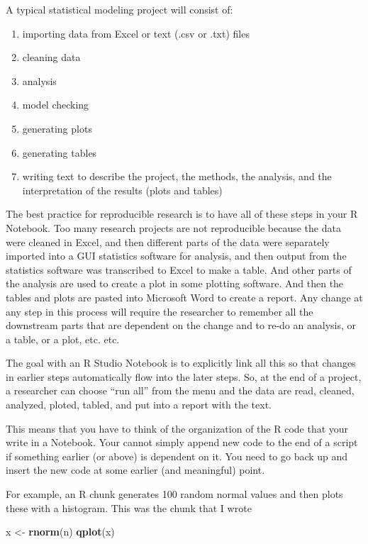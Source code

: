 \documentclass[]{book}
\newenvironment{Shaded}{\begin{snugshade}}{\end{snugshade}}
\newcommand{\KeywordTok}[1]{\textcolor[rgb]{0.13,0.29,0.53}{\textbf{#1}}}
\newcommand{\StringTok}[1]{\textcolor[rgb]{0.31,0.60,0.02}{#1}}
\newcommand{\NormalTok}[1]{#1}
\providecommand{\tightlist}{%
  \setlength{\itemsep}{0pt}\setlength{\parskip}{0pt}}
\begin{document}
A typical statistical modeling project will consist of:

\begin{enumerate}
\def\labelenumi{\arabic{enumi}.}
\tightlist
\item
  importing data from Excel or text (.csv or .txt) files
\item
  cleaning data
\item
  analysis
\item
  model checking
\item
  generating plots
\item
  generating tables
\item
  writing text to describe the project, the methods, the analysis, and
  the interpretation of the results (plots and tables)
\end{enumerate}

The best practice for reproducible research is to have all of these
steps in your R Notebook. Too many research projects are not
reproducible because the data were cleaned in Excel, and then different
parts of the data were separately imported into a GUI statistics
software for analysis, and then output from the statistics software was
transcribed to Excel to make a table. And other parts of the analysis
are used to create a plot in some plotting software. And then the tables
and plots are pasted into Microsoft Word to create a report. Any change
at any step in this process will require the researcher to remember all
the downstream parts that are dependent on the change and to re-do an
analysis, or a table, or a plot, etc. etc.

The goal with an R Studio Notebook is to explicitly link all this so
that changes in earlier steps automatically flow into the later steps.
So, at the end of a project, a researcher can choose ``run all'' from
the menu and the data are read, cleaned, analyzed, ploted, tabled, and
put into a report with the text.

This means that you have to think of the organization of the R code that
your write in a Notebook. Your cannot simply append new code to the end
of a script if something earlier (or above) is dependent on it. You need
to go back up and insert the new code at some earlier (and meaningful)
point.

For example, an R chunk generates 100 random normal values and then
plots these with a histogram. This was the chunk that I wrote

\begin{Shaded}
\begin{Highlighting}[]
\NormalTok{x <-}\StringTok{ }\KeywordTok{rnorm}\NormalTok{(n)}
\KeywordTok{qplot}\NormalTok{(x)}
\end{Highlighting}
\end{Shaded}
\end{document}
